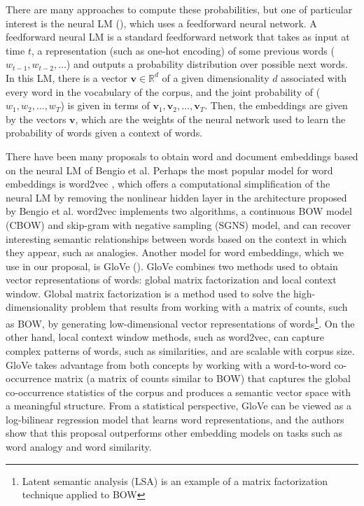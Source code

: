 \documentclass{article}
\begin{document}
There are many approaches to compute these probabilities, but one of particular interest is the neural LM (\cite{bengio2003}), which uses a feedforward neural network. A feedforward neural LM is a standard feedforward network that takes as input at time $t$, a representation (such as one-hot encoding) of some previous words ($w_{t-1},w_{t-2}, \ldots$)  and outputs a probability distribution over possible next words. In this LM, there is a vector $\mathbf{v}\in \mathbb{R}^d$ of a given dimensionality $d$ associated with every word in the vocabulary of the corpus, and the joint probability of ($w_1,w_2,\ldots,w_T$) is given in terms of $\mathbf{v}_1,\mathbf{v}_2,\ldots,\mathbf{v}_T$. Then, the embeddings are given by the vectors $\mathbf{v}$, which are the weights of the neural network used to learn the probability of words given a context of words.

There have been many proposals to obtain word and document embeddings based on the neural LM of Bengio et al. Perhaps the most popular model for word embeddings is word2vec \citep{word2vec_mikolov}, which offers a computational simplification of the neural LM by removing the nonlinear hidden layer in the architecture proposed by Bengio et al. word2vec implements two algorithms, a continuous BOW model (CBOW) and skip-gram with negative sampling (SGNS) model, and can recover interesting semantic relationships between words based on the context in which they appear, such as analogies. Another model for word embeddings, which we use in our proposal, is GloVe (\cite{pennington2014glove}). GloVe combines two methods used to obtain vector representations of words: global matrix factorization and local context window. Global matrix factorization is a method used to solve the high-dimensionality problem that results from working with a matrix of counts, such as BOW, by generating low-dimensional vector representations of words\footnote{Latent semantic analysis (LSA) is an example of a matrix factorization technique applied to BOW}. On the other hand, local context window methods, such as word2vec, can capture complex patterns of words, such as similarities, and are scalable with corpus size. GloVe takes advantage from both concepts by working with a word-to-word co-occurrence matrix (a matrix of counts similar to BOW) that captures the  global co-occurrence statistics of the corpus and produces a semantic vector space with a meaningful structure. From a statistical perspective, GloVe can be viewed as a log-bilinear regression model that learns word representations, and the authors show that this proposal outperforms other embedding models on tasks such as word analogy and word similarity.
\end{document}
